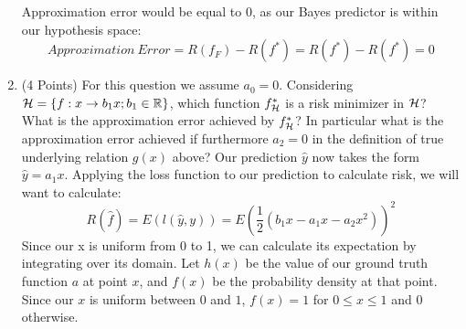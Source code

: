 \documentclass{article}
\newcommand{\bb}{b}
\begin{document}
\begin{enumerate}
    Approximation error would be equal to 0, as our Bayes predictor is within our hypothesis space: $$Approximation \ Error = R(f_F) - R(f^*) = R(f^*) - R(f^*) = 0$$
    
    \item (4 Points) For this question we assume $a_0 = 0$. Considering $\gH= \left\{f: x \rightarrow \bb_1 x;  \bb_1 \in \sR\right\}$, which function $f^*_{{\mathcal{H}}}$ is a risk minimizer in ${\mathcal{H}}$? What is the approximation error achieved by $f^*_{{\mathcal{H}}}$? In particular what is the approximation error achieved if furthermore $a_2=0$ in the definition of true underlying relation $g(x)$ above?
    \subitem 
    Our prediction $\hat{y}$ now takes the form $\hat{y} = a_1x$. Applying the loss function to our prediction to calculate risk, we will want to calculate:
    $$
        R(\hat{f}) = E(l(\hat{y},y)) = E(\frac{1}{2}(b_1x - a_1x - a_2x^2))^2
    $$
    Since our x is uniform from 0 to 1, we can calculate its expectation by integrating over its domain. Let $h(x)$ be the value of our ground truth function $a$ at point $x$, and $f(x)$ be the probability density at that point. Since our $x$ is uniform between $0$ and $1$, $f(x)=1$ for $0 \leq x \leq1$ and $0$ otherwise.
    

\end{enumerate}
\end{document}
